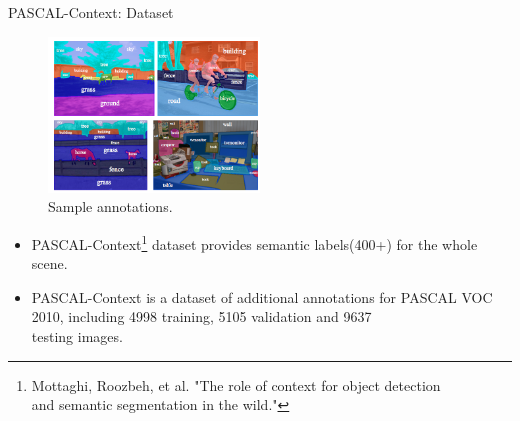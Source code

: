 \documentclass{beamer}
\begin{document}
\begin{frame}{PASCAL-Context: Dataset}	
\vspace{-0.3cm}
\begin{figure}
	\centering
	\includegraphics[width=0.50\textwidth]{figure/ss45.png}
	\captionsetup{justification=centering}
	\caption{Sample annotations.}
\end{figure}
\vspace{-0.5cm}
\begin{itemize}
	\item PASCAL-Context\footnote{Mottaghi, Roozbeh, et al. "The role of context for object detection\\ and semantic segmentation in the wild."} dataset provides semantic labels({\color{blue}400+}) for the whole scene.
	\item PASCAL-Context is a dataset of additional annotations for PASCAL VOC 2010, including {\color{blue}4998} training, {\color{blue}5105} validation and {\color{blue}9637} \\testing images.
\end{itemize}
\end{frame}
\end{document}

